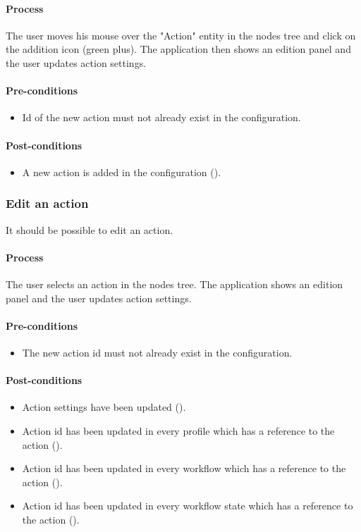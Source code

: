 \documentclass[11pt,a4paper,oneside]{article}
\begin{document}
\paragraph{Process}
The user moves his mouse over the "Action" entity in the nodes tree and click on the addition icon (green plus). The application then shows an edition panel and the user updates action settings.

\paragraph{Pre-conditions}
\begin{itemize}
	\item Id of the new action must not already exist in the configuration.
\end{itemize}

\paragraph{Post-conditions}
\begin{itemize}
	\item A new action is added in the configuration ().
\end{itemize}

\subsubsection{Edit an action}
It should be possible to edit an action.

\paragraph{Process}
The user selects an action in the nodes tree. The application shows an edition panel and the user updates action settings.

\paragraph{Pre-conditions}
\begin{itemize}
	\item The new action id must not already exist in the configuration.
\end{itemize}

\paragraph{Post-conditions}
\begin{itemize}
	\item Action settings have been updated ().
	\item Action id has been updated in every profile which has a reference to the action ().
	\item Action id has been updated in every workflow which has a reference to the action ().
	\item Action id has been updated in every workflow state which has a reference to the action ().
\end{itemize}
\end{document}
